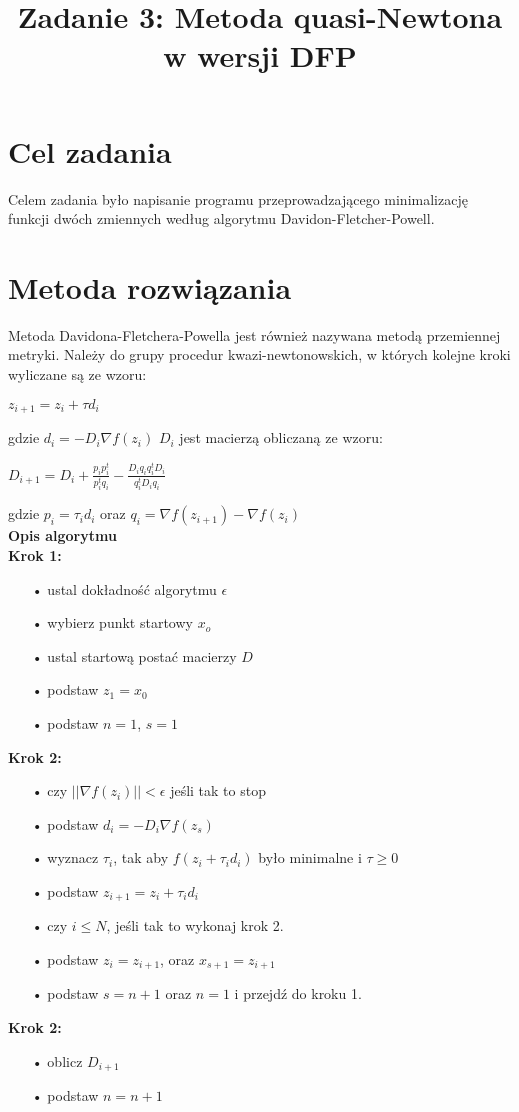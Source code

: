 \documentclass{classrep}
\author{%
  \studentinfo{Michał Janiszewski}{169485} \and
  \studentinfo{Leszek Wach}{169513}
}
\title{Zadanie 3: Metoda quasi-Newtona w wersji DFP}
\begin{document}
\maketitle

\section{Cel zadania}
Celem zadania było napisanie programu przeprowadzającego minimalizację funkcji dwóch zmiennych według algorytmu Davidon-Fletcher-Powell.

\section{Metoda rozwiązania}
Metoda Davidona-Fletchera-Powella jest również nazywana metodą przemiennej metryki. Należy do grupy procedur kwazi-newtonowskich, w których kolejne kroki wyliczane są ze wzoru:
\begin{center}
	$z_{i+1} = z_i + \tau d_i$
\end{center}
gdzie $d_i = -D_i \nabla f(z_i)$
$D_i$ jest macierzą obliczaną ze wzoru:
\begin{center}
$D_{i+1} = D_i + \frac{p_i p^{t}_i}{p^{t}_i q_i} - \frac{D_i q_i q^{t}_i D_i}{q^{t}_i D_i q_i}$\\
\end{center}
gdzie $p_i = \tau_i d_i$ oraz $q_i = \nabla f(z_{i+1}) - \nabla f(z_i)$\\

\textbf{Opis algorytmu}\\
\textbf{Krok 1:}
\begin{itemize}
\item[•] ustal dokładność algorytmu $\epsilon$
\item[•] wybierz punkt startowy $x_o$
\item[•] ustal startową postać macierzy $D$
\item[•] podstaw $z_1 = x_0$
\item[•] podstaw $n = 1$, $s = 1$
\end{itemize}
\textbf{Krok 2:}
\begin{itemize}
\item[•] czy $||\nabla f(z_i)|| < \epsilon $ jeśli tak to stop
\item[•] podstaw $d_i = -D_i \nabla f(z_s)$
\item[•] wyznacz $\tau_i$, tak aby $f(z_i + \tau_i d_i)$ było minimalne i $\tau \geq 0$
\item[•] podstaw $z_{i+1} = z_i + \tau_i d_i$
\item[•] czy $i \leq N$, jeśli tak to wykonaj krok 2.
\item[•] podstaw $z_i = z_{i+1}$, oraz $x_{s+1} = z_{i+1}$
\item[•] podstaw $s = n+1$ oraz $n = 1$ i przejdź do kroku 1.
\end{itemize}
\textbf{Krok 2:}
\begin{itemize}
\item[•] oblicz $D_{i+1}$
\item[•] podstaw $n = n+1$
\end{itemize}
\end{document}
